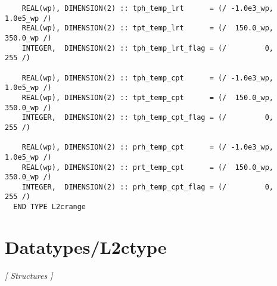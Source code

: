 \begin{Verbatim}
    REAL(wp), DIMENSION(2) :: tph_temp_lrt      = (/ -1.0e3_wp,  1.0e5_wp /)
    REAL(wp), DIMENSION(2) :: tpt_temp_lrt      = (/  150.0_wp,  350.0_wp /)
    INTEGER,  DIMENSION(2) :: tph_temp_lrt_flag = (/         0,       255 /)

    REAL(wp), DIMENSION(2) :: tph_temp_cpt      = (/ -1.0e3_wp,  1.0e5_wp /)
    REAL(wp), DIMENSION(2) :: tpt_temp_cpt      = (/  150.0_wp,  350.0_wp /)
    INTEGER,  DIMENSION(2) :: tph_temp_cpt_flag = (/         0,       255 /)

    REAL(wp), DIMENSION(2) :: prh_temp_cpt      = (/ -1.0e3_wp,  1.0e5_wp /)
    REAL(wp), DIMENSION(2) :: prt_temp_cpt      = (/  150.0_wp,  350.0_wp /)
    INTEGER,  DIMENSION(2) :: prh_temp_cpt_flag = (/         0,       255 /)
  END TYPE L2crange
\end{Verbatim}
\section{Datatypes/L2ctype}
\textsl{[ Structures ]}

